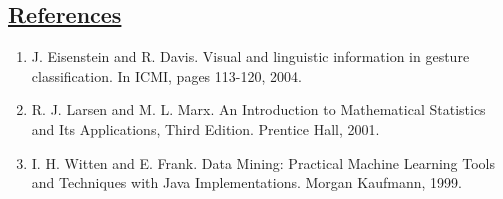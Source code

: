 \begin{kasten}
    \section*{ \hspace{0.1cm} {\color{red} \underline{References}}}
    \vspace{-0.5em}
    \normalsize{
      \begin{enumerate}
      \item J. Eisenstein and R. Davis. Visual and linguistic information in gesture classification. In ICMI, pages 113-120, 2004.
      \item R. J. Larsen and M. L. Marx. An Introduction to Mathematical Statistics and Its Applications, Third Edition. Prentice Hall, 2001.
      \item I. H. Witten and E. Frank. Data Mining: Practical Machine Learning Tools and Techniques with Java Implementations. Morgan Kaufmann, 1999.
      \end{enumerate}
    }
\end{kasten}
